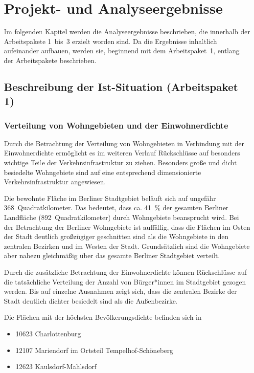 \newpage
\section{Projekt-  und Analyseergebnisse}
\label{projekt_und_analyseergebnisse}

Im folgenden Kapitel werden die Analyseergebnisse beschrieben, die innerhalb der Arbeitspakete 1~bis~3 erzielt worden sind. Da die Ergebnisse inhaltlich aufeinander aufbauen, werden sie, beginnend mit dem Arbeitspaket~1, entlang der Arbeitspakete beschrieben.

\subsection{Beschreibung der Ist-Situation (Arbeitspaket 1)}
\label{beschreibung_der_ist_situation_arbeitspaket_1}

\subsubsection{Verteilung von Wohngebieten und der Einwohnerdichte}

Durch die Betrachtung der Verteilung von Wohngebieten in Verbindung mit der Einwohnerdichte ermöglicht es im weiteren Verlauf Rückschlüsse auf besonders wichtige Teile der Verkehrsinfrastruktur zu ziehen. Besonders große und dicht besiedelte Wohngebiete sind auf eine entsprechend dimensionierte Verkehrsinfrastruktur angewiesen.

Die bewohnte Fläche im Berliner Stadtgebiet beläuft sich auf ungefähr 368~Quadratkilometer. Das bedeutet, dass ca. 41~\% der gesamten Berliner Landfläche (892~Quadratkilometer) durch Wohngebiete beansprucht wird. Bei der Betrachtung der Berliner Wohngebiete ist auffällig, dass die Flächen im Osten der Stadt deutlich großzügiger geschnitten sind als die Wohngebiete in den zentralen Bezirken und im Westen der Stadt. Grundsätzlich sind die Wohngebiete aber nahezu gleichmäßig über das gesamte Berliner Stadtgebiet verteilt.

Durch die zusätzliche Betrachtung der Einwohnerdichte können Rückschlüsse auf die tatsächliche Verteilung der Anzahl von Bürger*innen im Stadtgebiet gezogen werden. Bis auf einzelne Ausnahmen zeigt sich, dass die zentralen Bezirke der Stadt deutlich dichter besiedelt sind als die Außenbezirke.

Die Flächen mit der höchsten Bevölkerungsdichte befinden sich in

\begin{itemize}
    \item 10623 Charlottenburg
    \item 12107 Mariendorf im Ortsteil Tempelhof-Schöneberg
    \item 12623 Kaulsdorf-Mahlsdorf
\end{itemize}

